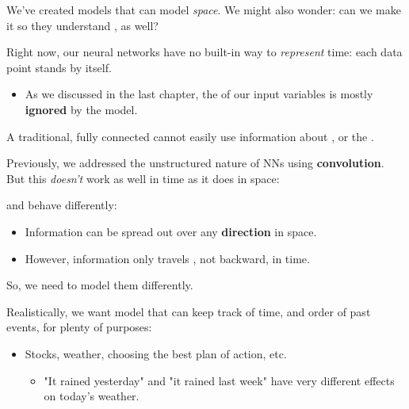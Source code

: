         We've created models that can model \textit{space}. We might also wonder: can we make it so they understand , as well?

        Right now, our neural networks have no built-in way to \textit{represent} time: each data point stands by itself.

        \begin{itemize}
            \item As we discussed in the last chapter, the  of our input variables is mostly \textbf{ignored} by the model.\\
        \end{itemize}

        \begin{concept}
            A traditional, fully connected  cannot easily use information about , or the .
        \end{concept}

        Previously, we addressed the unstructured nature of NNs using \textbf{convolution}. But this \textit{doesn't} work as well in time as it does in space:\\

        \begin{concept}
             and  behave differently:
            
            \begin{itemize}
                \item Information can be spread out over any \textbf{direction} in space.
                \item However, information only travels , not backward, in time.
            \end{itemize}

            So, we need to model them differently.
        \end{concept}
        
        Realistically, we want model that can keep track of time, and order of past events, for plenty of purposes:

        \begin{itemize}
            \item \miniex Stocks, weather, choosing the best plan of action, etc.
                \begin{itemize}
                    \item "It rained yesterday" and "it rained last week" have very different effects on today's weather.
                \end{itemize}
        \end{itemize}
        

